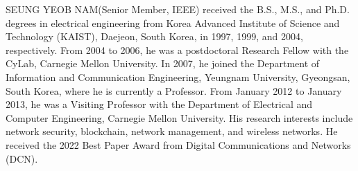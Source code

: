 \documentclass[lettersize,journal]{IEEEtran}
\begin{document}
\begin{IEEEbiographynophoto}{SEUNG YEOB NAM}(Senior Member, IEEE) received the B.S., M.S., and Ph.D. degrees in electrical engineering from Korea Advanced Institute of Science and Technology (KAIST), Daejeon, South Korea, in 1997, 1999, and 2004, respectively. From 2004 to 2006, he was a postdoctoral Research Fellow with the CyLab, Carnegie Mellon University. In 2007, he joined the Department of Information and Communication Engineering, Yeungnam University, Gyeongsan, South Korea, where he is currently a Professor. From January 2012 to January 2013, he was a Visiting Professor with the Department of Electrical and Computer Engineering, Carnegie Mellon University. His research interests include network security, blockchain, network management, and wireless networks. He received the 2022 Best Paper Award from Digital Communications and Networks (DCN).
\end{IEEEbiographynophoto}

\vfill
\end{document}
